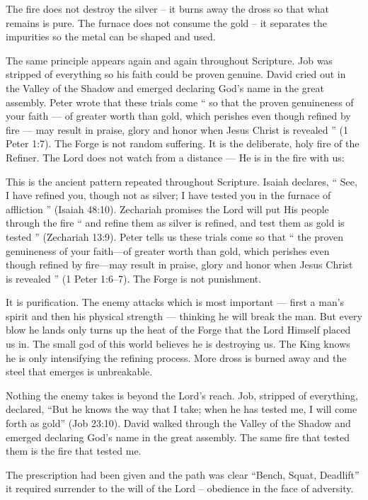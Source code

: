 \documentclass[12pt,a4paper]{book}
\begin{document}
The fire does not destroy the silver -- it burns away the dross so that what remains is pure.  The furnace does not consume the gold -- it separates the impurities so the metal can be shaped and used.

The same principle appears again and again throughout Scripture. Job was stripped of everything so his faith could be proven genuine. David cried out in the Valley of the Shadow and emerged declaring God’s name in the great assembly. Peter wrote that these trials come “ so that the proven genuineness of your faith — of greater worth than gold, which perishes even though refined by fire — may result in praise, glory and honor when Jesus Christ is revealed ” (1 Peter 1:7).  The Forge is not random suffering. It is the deliberate, holy fire of the Refiner.  The Lord does not watch from a distance — He is in the fire with us:

This is the ancient pattern repeated throughout Scripture. Isaiah declares, “ See, I have refined you, though not as silver; I have tested you in the furnace of affliction ” (Isaiah 48:10).   Zechariah promises the Lord will put His people through the fire “ and refine them as silver is refined, and test them as gold is tested ” (Zechariah 13:9). Peter tells us these trials come so that “ the proven genuineness of your faith—of greater worth than gold, which perishes even though refined by fire—may result in praise, glory and honor when Jesus Christ is revealed ” (1 Peter 1:6–7).
The Forge is not punishment. 

It is purification. The enemy attacks which is most important — first a man's spirit and then his physical strength — thinking he will break the man. But every blow he lands only turns up the heat of the Forge that the Lord Himself placed us in. The small god of this world believes he is destroying us. The King knows he is only intensifying the refining process. More dross is burned away and the steel that emerges is unbreakable.

Nothing the enemy takes is beyond the Lord’s reach.  Job, stripped of everything, declared, “But he knows the way that I take; when he has tested me, I will come forth as gold” (Job 23:10). David walked through the Valley of the Shadow and emerged declaring God’s name in the great assembly. The same fire that tested them is the fire that tested me.

The prescription had been given and the path was clear “Bench, Squat, Deadlift” it required surrender to the will of the Lord -- obedience in the face of adversity.
\end{document}
